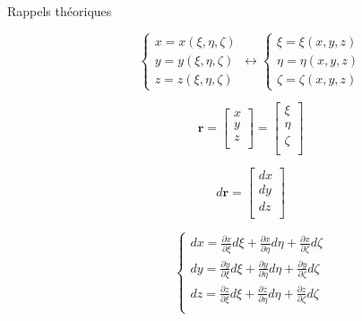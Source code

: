 \documentclass
[
a4paper,                      %
twoside,					  %
12pt,                         %
abstract,		      %
fleqn,                        %
]
{scrartcl} %
\begin{document}
\begin{description}

\item[Rappels th\'eoriques]

\begin{equation}
\begin{cases}
x=x\left(\xi,\eta,\zeta\right)\\
y=y\left(\xi,\eta,\zeta\right)\\
z=z\left(\xi,\eta,\zeta\right)
\end{cases}\longleftrightarrow\begin{cases}
\xi=\xi\left(x,y,z\right)\\
\eta=\eta\left(x,y,z\right)\\
\zeta=\zeta\left(x,y,z\right)
\end{cases}
\end{equation}

\begin{equation}
\mathbf{r}=\begin{bmatrix}
x\\
y\\
z\\
\end{bmatrix}=\begin{bmatrix}
\xi\\
\eta\\
\zeta\\
\end{bmatrix}
\end{equation}

\begin{equation}
d\mathbf{r}=\begin{bmatrix}
dx\\
dy\\
dz\\
\end{bmatrix}
\end{equation}

\begin{equation}
\begin{cases}
dx=\frac{\partial x}{\partial\xi}d \xi+\frac{\partial x}{\partial\eta}d \eta+\frac{\partial x}{\partial\zeta}d \zeta\\
dy=\frac{\partial y}{\partial\xi}d \xi+\frac{\partial y}{\partial\eta}d \eta+\frac{\partial y}{\partial\zeta}d \zeta\\
dz=\frac{\partial z}{\partial\xi}d \xi+\frac{\partial z}{\partial\eta}d \eta+\frac{\partial z}{\partial\zeta}d \zeta\\
\end{cases}
\end{equation}


\end{description}
\end{document}

